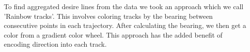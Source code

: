 To find aggregated desire lines from the data we took an approach which we call 'Rainbow tracks'. 
This involves coloring tracks by the bearing between consecutive points in each trajectory. 
After calculating the bearing, we then get a color from a gradient color wheel. 
This approach has the added benefit of encoding direction into each track.
\ \\ 


